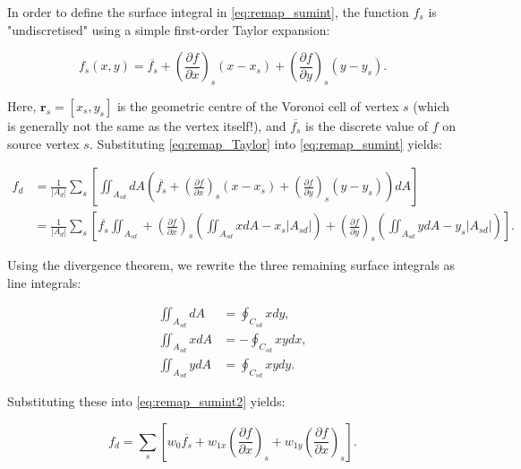 \documentclass{article}
\begin{document}
In order to define the surface integral in \eqref{eq:remap_sumint}, the function $f_s$ is "undiscretised" using a simple first-order Taylor expansion:

\begin{equation} \label{eq:remap_Taylor}
f_s(x,y) = \overline{f_s} + {\left( \frac{\partial f}{\partial x} \right)}_s \left( x - x_s \right) + {\left( \frac{\partial f}{\partial y} \right)}_s \left( y - y_s \right).
\end{equation}

Here, $\textbf{r}_s = \left[ x_s, y_s \right]$ is the geometric centre of the Voronoi cell of vertex $s$ (which is generally not the same as the vertex itself!), and $\overline{f_s}$ is the discrete value of $f$ on source vertex $s$. Substituting \eqref{eq:remap_Taylor} into \eqref{eq:remap_sumint} yields:

\begin{align} \label{eq:remap_sumint2}
f_d &= \frac{1}{|A_d|} \sum_s \left[ \iint_{A_{sd}} dA \left( \overline{f_s} + 
{\left( \frac{\partial f}{\partial x} \right)}_s \left( x - x_s \right) + 
{\left( \frac{\partial f}{\partial y} \right)}_s \left( y - y_s \right) \right) dA \right] \\
&= \frac{1}{|A_d|} \sum_s \left[ \overline{f_s} \iint_{A_{sd}} + 
{\left( \frac{\partial f}{\partial x} \right)}_s \left( \iint_{A_{sd}} xdA - x_s |A_{sd}| \right) +
{\left( \frac{\partial f}{\partial y} \right)}_s \left( \iint_{A_{sd}} ydA - y_s |A_{sd}| \right) \right].
\end{align}

Using the divergence theorem, we rewrite the three remaining surface integrals as line integrals:

\begin{align} \label{eq:remap_lineints}
\iint_{A_{sd}} dA &= \oint_{C_{sd}} x dy, \\
\iint_{A_{sd}} x dA &= - \oint_{C_{sd}} xy dx, \\
\iint_{A_{sd}} y dA &= \oint_{C_{sd}} xy dy.
\end{align}

Substituting these into \eqref{eq:remap_sumint2} yields:

\begin{equation} \label{eq:remap_remap}
f_d = \sum_s \left[ w_0 \overline{f_s} + w_{1x} {\left( \frac{\partial f}{\partial x} \right) }_s + 
w_{1y} {\left( \frac{\partial f}{\partial x} \right) }_s \right].
\end{equation}
\end{document}
